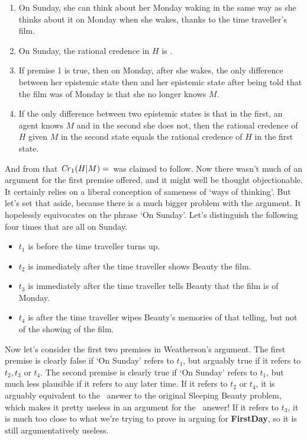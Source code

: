 \begin{enumerate}
\item On Sunday, she can think about her Monday waking in the same way as she thinks about it on Monday when she wakes, thanks to the time traveller's film.
\item On Sunday, the rational credence in $H$ is \half.
\item If premise 1 is true, then on Monday, after she wakes, the only difference between her epistemic state then and her epistemic state after being told that the film was of Monday is that she no longer knows $M$.
\item If the only difference between two epistemic states is that in the first, an agent knows $M$ and in the second she does not, then the rational credence of $H$ given $M$ in the second state equals the rational credence of $H$ in the first state.
\end{enumerate}

\noindent And from that $\text{\textit{Cr}}_1(H | M) = $\half\ was claimed to follow. Now there wasn't much of an argument for the first premise offered, and it might well be thought objectionable. It certainly relies on a liberal conception of sameness of `ways of thinking'. But let's set that aside, because there is a much bigger problem with the argument. It hopelessly equivocates on the phrase `On Sunday'. Let's distinguish the following four times that are all on Sunday.

\begin{itemize}
\item $t_1$ is before the time traveller turns up.
\item $t_2$ is immediately after the time traveller shows Beauty the film.
\item $t_3$ is immediately after the time traveller tells Beauty that the film is of Monday.
\item $t_4$ is after the time traveller wipes Beauty's memories of that telling, but not of the showing of the film.
\end{itemize}

\noindent Now let's consider the first two premises in Weatherson's argument. The first premise is clearly false if `On Sunday' refers to $t_1$, but arguably true if it refers to $t_2, t_3$ or $t_4$. The second premise is clearly true if `On Sunday' refers to $t_1$, but much less plausible if it refers to any later time. If it refers to $t_2$ or $t_4$, it is arguably equivalent to the \half\ answer to the original Sleeping Beauty problem, which makes it pretty useless in an argument for the \third\ answer! If it refers to $t_3$, it is much too close to what we're trying to prove in arguing for \textbf{FirstDay}, so it is still argumentatively useless.

